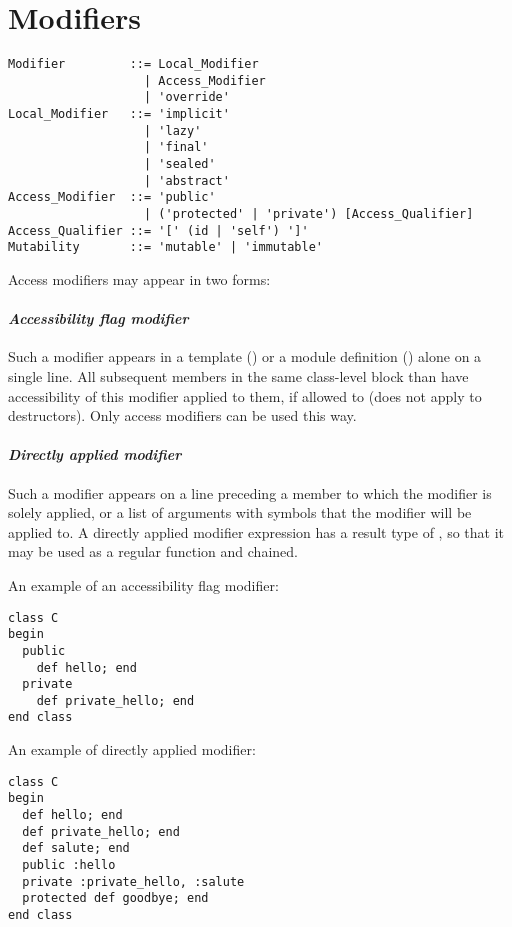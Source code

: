 \section{Modifiers}
\label{sec:modifiers}

\syntax\begin{lstlisting}
Modifier         ::= Local_Modifier
                   | Access_Modifier
                   | 'override'
Local_Modifier   ::= 'implicit'
                   | 'lazy'
                   | 'final'
                   | 'sealed'
                   | 'abstract'
Access_Modifier  ::= 'public'
                   | ('protected' | 'private') [Access_Qualifier]
Access_Qualifier ::= '[' (id | 'self') ']'
Mutability       ::= 'mutable' | 'immutable'
\end{lstlisting}

Access modifiers may appear in two forms:

\paragraph{\em Accessibility flag modifier}
Such a modifier appears in a template () or a module definition () alone on a single line. All subsequent members in the same class-level block than have accessibility of this modifier applied to them, if allowed to (does not apply to destructors). Only access modifiers can be used this way. 

\paragraph{\em Directly applied modifier}
Such a modifier appears on a line preceding a member to which the modifier is solely applied, or a list of arguments with symbols that the modifier will be applied to. A directly applied modifier expression has a result type of , so that it may be used as a regular function and chained. 

\example An example of an accessibility flag modifier:
\begin{lstlisting}
class C
begin
  public
    def hello; end
  private
    def private_hello; end
end class
\end{lstlisting}

\example An example of directly applied modifier:
\begin{lstlisting}
class C
begin
  def hello; end
  def private_hello; end
  def salute; end
  public :hello
  private :private_hello, :salute
  protected def goodbye; end
end class
\end{lstlisting}

